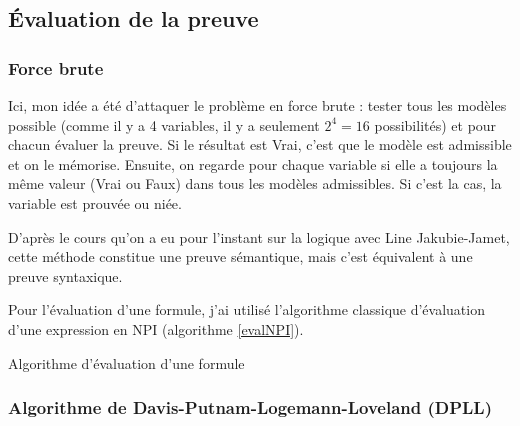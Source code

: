 \documentclass[12pt, algo]{cours}
\begin{document}
\subsection{Évaluation de la preuve}

\subsubsection{Force brute}

Ici, mon idée a été d'attaquer le problème en force brute : tester tous les modèles possible (comme il y a 4 variables, il y a seulement $2^4=16$ possibilités) et pour chacun évaluer la preuve. Si le résultat est Vrai, c'est que le modèle est admissible et on le mémorise. Ensuite, on regarde pour chaque variable si elle a toujours la même valeur (Vrai ou Faux) dans tous les modèles admissibles. Si c'est la cas, la variable est prouvée ou niée.

\medskip
D'après le cours qu'on a eu pour l'instant sur la logique avec Line Jakubie-Jamet, cette méthode constitue une preuve sémantique, mais c'est équivalent à une preuve syntaxique.

\medskip

Pour l'évaluation d'une formule, j'ai utilisé l'algorithme classique d'évaluation d'une expression en NPI (algorithme \ref{evalNPI}).

\begin{algorithm}
\caption{Algorithme d'évaluation d'une formule}
\label{evalNPI}
\end{algorithm}

\subsubsection{Algorithme de Davis-Putnam-Logemann-Loveland (DPLL)}
\end{document}
